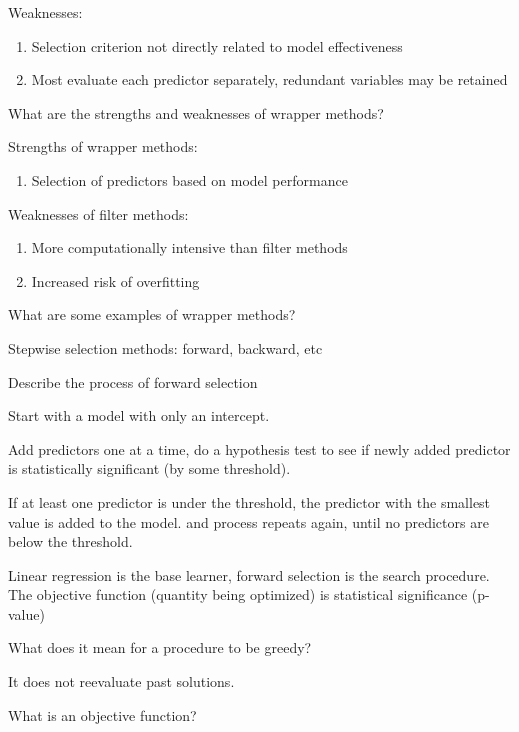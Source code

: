 \documentclass[10pt]{book}
\begin{document}
Weaknesses:
\begin{enumerate}
  \item Selection criterion not directly related to model effectiveness
  \item Most evaluate each predictor separately, redundant variables may be retained
\end{enumerate}

\hrulefill

What are the strengths and weaknesses of wrapper methods?

Strengths of wrapper methods:
\begin{enumerate}
  \item Selection of predictors based on model performance
\end{enumerate}

Weaknesses of filter methods:
\begin{enumerate}
  \item More computationally intensive than filter methods
  \item Increased risk of overfitting
\end{enumerate}

\hrulefill

What are some examples of wrapper methods?

Stepwise selection methods: forward, backward, etc


\hrulefill

Describe the process of forward selection

Start with a model with only an intercept.

Add predictors one at a time, do a hypothesis test to see if newly added predictor is statistically significant (by some threshold). 

If at least one predictor is under the threshold, the predictor with the smallest value is added to the model.
 and process repeats again, until no predictors are below the threshold.

Linear regression is the base learner, forward selection is the search procedure. The objective function (quantity being optimized) is statistical significance (p-value)

\hrulefill

What does it mean for a procedure to be greedy?

It does not reevaluate past solutions.

\hrulefill

What is an objective function?
\end{document}

